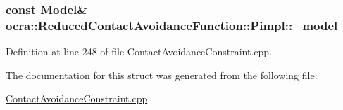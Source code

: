 \subsubsection[{\texorpdfstring{\+\_\+model}{_model}}]{\setlength{\rightskip}{0pt plus 5cm}const {\bf Model}\& ocra\+::\+Reduced\+Contact\+Avoidance\+Function\+::\+Pimpl\+::\+\_\+model}\hypertarget{structReducedContactAvoidanceFunction_1_1Pimpl_acd2bf5f47839d39cb37ac323e038558f}{}\label{structReducedContactAvoidanceFunction_1_1Pimpl_acd2bf5f47839d39cb37ac323e038558f}


Definition at line 248 of file Contact\+Avoidance\+Constraint.\+cpp.



The documentation for this struct was generated from the following file\+:\begin{DoxyCompactItemize}
\item 
\hyperlink{ContactAvoidanceConstraint_8cpp}{Contact\+Avoidance\+Constraint.\+cpp}\end{DoxyCompactItemize}
